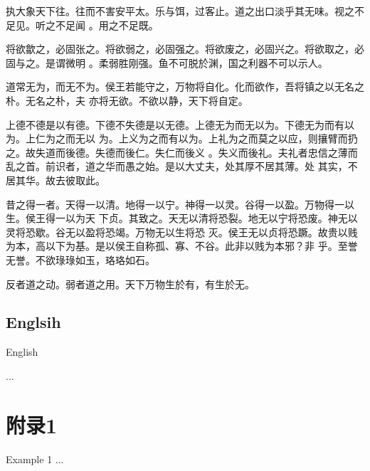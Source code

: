 \documentclass[a4paper, twoside, openany, extrafontsizes]{dlutthesis}
\begin{document}
执大象天下往。往而不害安平太。乐与饵，过客止。道之出口淡乎其无味。视之不足见。听之不足闻
。用之不足既。

将欲歙之，必固张之。将欲弱之，必固强之。将欲废之，必固兴之。将欲取之，必固与之。是谓微明
。柔弱胜刚强。鱼不可脱於渊，国之利器不可以示人。

道常无为，而无不为。侯王若能守之，万物将自化。化而欲作，吾将镇之以无名之朴。无名之朴，夫
亦将无欲。不欲以静，天下将自定。

上德不德是以有德。下德不失德是以无德。上德无为而无以为。下德无为而有以为。上仁为之而无以
为。上义为之而有以为。上礼为之而莫之以应，则攘臂而扔之。故失道而後德。失德而後仁。失仁而後义
。失义而後礼。夫礼者忠信之薄而乱之首。前识者，道之华而愚之始。是以大丈夫，处其厚不居其薄。处
其实，不居其华。故去彼取此。

昔之得一者。天得一以清。地得一以宁。神得一以灵。谷得一以盈。万物得一以生。侯王得一以为天
下贞。其致之。天无以清将恐裂。地无以宁将恐废。神无以灵将恐歇。谷无以盈将恐竭。万物无以生将恐
灭。侯王无以贞将恐蹶。故贵以贱为本，高以下为基。是以侯王自称孤、寡、不谷。此非以贱为本邪？非
乎。至誉无誉。不欲琭琭如玉，珞珞如石。

反者道之动。弱者道之用。天下万物生於有，有生於无。

\section{Englsih}{English}
\label{sec:englsih}

\lipsum[1-9]


\printpagenotes

\begin{thebibliography}
	...
\end{thebibliography}

\appendix
\chapter{附录1}{Example 1}
...

\backmatter
\end{document}
